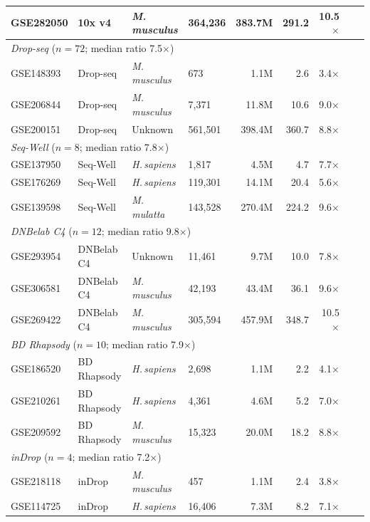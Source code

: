\documentclass[10pt,twocolumn,letterpaper]{article}
\begin{document}
\begin{table}[h]
\begin{tabular}{llllrrrrr}
GSE282050  & 10x v4 & \textit{M.\,musculus}    &  364{,}236 &  383.7M &  291.2 & 10.5$\times$ \\
\midrule
\multicolumn{7}{l}{\textit{Drop-seq} ($n = 72$; median ratio 7.5$\times$)} \\
GSE148393  & Drop-seq & \textit{M.\,musculus}    &      673 &    1.1M &    2.6 &  3.4$\times$ \\
GSE206844  & Drop-seq & \textit{M.\,musculus}    &    7{,}371 &   11.8M &   10.6 &  9.0$\times$ \\
GSE200151  & Drop-seq & Unknown                  &  561{,}501 &  398.4M &  360.7 &  8.8$\times$ \\
\midrule
\multicolumn{7}{l}{\textit{Seq-Well} ($n = 8$; median ratio 7.8$\times$)} \\
GSE137950  & Seq-Well & \textit{H.\,sapiens}     &    1{,}817 &    4.5M &    4.7 &  7.7$\times$ \\
GSE176269  & Seq-Well & \textit{H.\,sapiens}     &  119{,}301 &   14.1M &   20.4 &  5.6$\times$ \\
GSE139598  & Seq-Well & \textit{M.\,mulatta}     &  143{,}528 &  270.4M &  224.2 &  9.6$\times$ \\
\midrule
\multicolumn{7}{l}{\textit{DNBelab C4} ($n = 12$; median ratio 9.8$\times$)} \\
GSE293954  & DNBelab C4 & Unknown                  &   11{,}461 &    9.7M &   10.0 &  7.8$\times$ \\
GSE306581  & DNBelab C4 & \textit{M.\,musculus}    &   42{,}193 &   43.4M &   36.1 &  9.6$\times$ \\
GSE269422  & DNBelab C4 & \textit{M.\,musculus}    &  305{,}594 &  457.9M &  348.7 & 10.5$\times$ \\
\midrule
\multicolumn{7}{l}{\textit{BD Rhapsody} ($n = 10$; median ratio 7.9$\times$)} \\
GSE186520  & BD Rhapsody & \textit{H.\,sapiens}     &    2{,}698 &    1.1M &    2.2 &  4.1$\times$ \\
GSE210261  & BD Rhapsody & \textit{H.\,sapiens}     &    4{,}361 &    4.6M &    5.2 &  7.0$\times$ \\
GSE209592  & BD Rhapsody & \textit{M.\,musculus}    &   15{,}323 &   20.0M &   18.2 &  8.8$\times$ \\
\midrule
\multicolumn{7}{l}{\textit{inDrop} ($n = 4$; median ratio 7.2$\times$)} \\
GSE218118  & inDrop & \textit{M.\,musculus}    &      457 &    1.1M &    2.4 &  3.8$\times$ \\
GSE114725  & inDrop & \textit{H.\,sapiens}     &   16{,}406 &    7.3M &    8.2 &  7.1$\times$ \\

\end{tabular}
\end{table}
\end{document}
